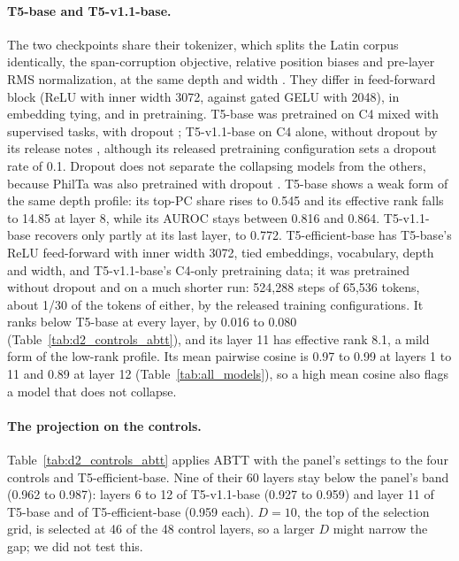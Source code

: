 \documentclass[11pt]{article}
\begin{document}
\paragraph{T5-base and T5-v1.1-base.}
The two checkpoints share their tokenizer, which splits the Latin corpus identically, the span-corruption objective, relative position biases and pre-layer RMS normalization, at the same depth and width \citep{raffel2020t5,t5v11release}.
They differ in feed-forward block (ReLU with inner width 3072, against gated GELU with 2048), in embedding tying, and in pretraining.
T5-base was pretrained on C4 mixed with supervised tasks, with dropout \citep{raffel2020t5}; T5-v1.1-base on C4 alone, without dropout by its release notes \citep{t5v11release}, although its released pretraining configuration sets a dropout rate of 0.1.
Dropout does not separate the collapsing models from the others, because PhilTa was also pretrained with dropout \citep{riemenschneider2023lata}.
T5-base shows a weak form of the same depth profile: its top-PC share rises to 0.545 and its effective rank falls to 14.85 at layer 8, while its AUROC stays between 0.816 and 0.864.
T5-v1.1-base recovers only partly at its last layer, to 0.772.
T5-efficient-base \citep{tay2022scale} has T5-base's ReLU feed-forward with inner width 3072, tied embeddings, vocabulary, depth and width, and T5-v1.1-base's C4-only pretraining data; it was pretrained without dropout and on a much shorter run: 524,288 steps of 65,536 tokens, about 1/30 of the tokens of either, by the released training configurations.
It ranks below T5-base at every layer, by 0.016 to 0.080 (Table~\ref{tab:d2_controls_abtt}), and its layer 11 has effective rank 8.1, a mild form of the low-rank profile.
Its mean pairwise cosine is 0.97 to 0.99 at layers 1 to 11 and 0.89 at layer 12 (Table~\ref{tab:all_models}), so a high mean cosine also flags a model that does not collapse.

\paragraph{The projection on the controls.}
Table~\ref{tab:d2_controls_abtt} applies ABTT with the panel's settings to the four controls and T5-efficient-base.
Nine of their 60 layers stay below the panel's band (0.962 to 0.987): layers 6 to 12 of T5-v1.1-base (0.927 to 0.959) and layer 11 of T5-base and of T5-efficient-base (0.959 each).
$D=10$, the top of the selection grid, is selected at 46 of the 48 control layers, so a larger $D$ might narrow the gap; we did not test this.
\end{document}
